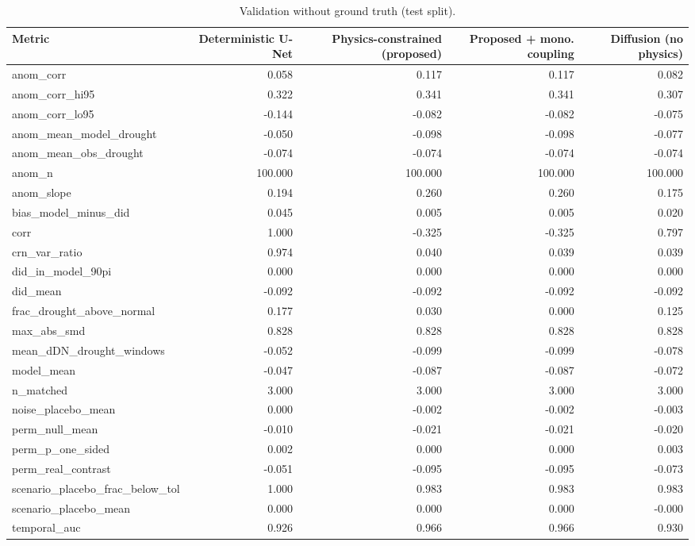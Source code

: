 \begin{table}[t]
\centering
\caption{Validation without ground truth (test split).}
\label{tab:validation}
\scriptsize
\begin{tabular}{lrrrr}
\hline
Metric & Deterministic U-Net & Physics-constrained (proposed) & Proposed + mono. coupling & Diffusion (no physics) \\
\hline
anom\_corr & 0.058 & 0.117 & 0.117 & 0.082 \\
anom\_corr\_hi95 & 0.322 & 0.341 & 0.341 & 0.307 \\
anom\_corr\_lo95 & -0.144 & -0.082 & -0.082 & -0.075 \\
anom\_mean\_model\_drought & -0.050 & -0.098 & -0.098 & -0.077 \\
anom\_mean\_obs\_drought & -0.074 & -0.074 & -0.074 & -0.074 \\
anom\_n & 100.000 & 100.000 & 100.000 & 100.000 \\
anom\_slope & 0.194 & 0.260 & 0.260 & 0.175 \\
bias\_model\_minus\_did & 0.045 & 0.005 & 0.005 & 0.020 \\
corr & 1.000 & -0.325 & -0.325 & 0.797 \\
crn\_var\_ratio & 0.974 & 0.040 & 0.039 & 0.039 \\
did\_in\_model\_90pi & 0.000 & 0.000 & 0.000 & 0.000 \\
did\_mean & -0.092 & -0.092 & -0.092 & -0.092 \\
frac\_drought\_above\_normal & 0.177 & 0.030 & 0.000 & 0.125 \\
max\_abs\_smd & 0.828 & 0.828 & 0.828 & 0.828 \\
mean\_dDN\_drought\_windows & -0.052 & -0.099 & -0.099 & -0.078 \\
model\_mean & -0.047 & -0.087 & -0.087 & -0.072 \\
n\_matched & 3.000 & 3.000 & 3.000 & 3.000 \\
noise\_placebo\_mean & 0.000 & -0.002 & -0.002 & -0.003 \\
perm\_null\_mean & -0.010 & -0.021 & -0.021 & -0.020 \\
perm\_p\_one\_sided & 0.002 & 0.000 & 0.000 & 0.003 \\
perm\_real\_contrast & -0.051 & -0.095 & -0.095 & -0.073 \\
scenario\_placebo\_frac\_below\_tol & 1.000 & 0.983 & 0.983 & 0.983 \\
scenario\_placebo\_mean & 0.000 & 0.000 & 0.000 & -0.000 \\
temporal\_auc & 0.926 & 0.966 & 0.966 & 0.930 \\
\hline
\end{tabular}
\end{table}
